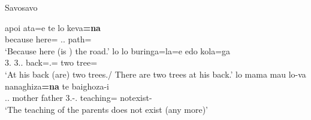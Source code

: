 \begin{exe}\ex\label{SavExist} {Savosavo} \citep[Solomons East Papuan; Solomon Islands; ][209, 122]{Wegener:2008}\nopagebreak[4]
\begin{xlist} 
\ex\gll apoi ata=e te lo keva\textbf{=na}\\
because here=\emphat{} \emphat{} \deter{}.\sg{}.\mas{} path=\nom{}\\
`Because here (is ) the road.'
\ex\gll lo lo buringa=la=e edo kola=ga\\
3\sg{}.\mas{} 3\sg{}.\mas{}.\gen{} back=\loc{}.\mas{}=\emphat{} two tree=\pl{}\\
\glt `At his back (are) two trees./ There are two trees at his back.'
\ex\gll lo mama mau lo-va nanaghiza\textbf{=na} te baighoza-i\\
\deter{}.\sg{}.\mas{} mother father 3\sg{}.\mas{}-\gen{}.\mas{} teaching=\nom{} \emphat{} not\-exist-\fin{}\\
\glt `The teaching of the parents does not exist (any more)'
\end{xlist}
\end{exe}





